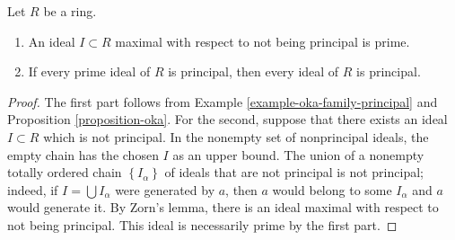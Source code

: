 \begin{lemma}
\label{lemma-primes-principal}
Let $R$ be a ring.
\begin{enumerate}
\item An ideal $I \subset R$ maximal with respect to not being
principal is prime.
\item If every prime ideal of $R$ is principal, then
every ideal of $R$ is principal.
\end{enumerate}
\end{lemma}

\begin{proof}
The first part follows from
Example \ref{example-oka-family-principal} and
Proposition \ref{proposition-oka}.
For the second, suppose that there exists an ideal $I \subset R$
which is not principal. In the nonempty set of nonprincipal ideals,
the empty chain has the chosen $I$ as an upper bound.
The union of a nonempty totally ordered chain
$\left\{I_\alpha\right\}$ of ideals that are not principal is not principal;
indeed, if $I = \bigcup I_\alpha$ were generated by
$a$, then $a$ would belong to some $I_\alpha $ and $a$ would generate it.
By Zorn's lemma, there is an ideal maximal with respect to not being
principal. This ideal is necessarily prime by the first part.
\end{proof}